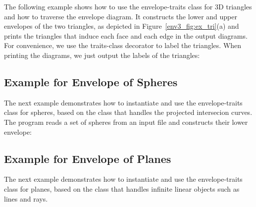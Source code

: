The following example shows how to use the envelope-traits class
for 3D triangles and how to traverse the envelope diagram. It
constructs the lower and upper envelopes of the two triangles,
as depicted in Figure~\ref{env3_fig:ex_tri}(a) and prints the
triangles that induce each face and each edge in the output diagrams.
For convenience, we use the traits-class decorator
 to label the triangles. When
printing the diagrams, we just output the labels of the triangles:


\subsection{Example for Envelope of Spheres}

The next example demonstrates how to instantiate and use the
envelope-traits class for spheres, based on the
 class that handles the projected intersecion
curves. The program reads a set of spheres from an input file and
constructs their lower envelope:


\subsection{Example for Envelope of Planes}

The next example demonstrates how to instantiate and use the
envelope-traits class for planes, based on the
 class that handles infinite linear objects such as lines and rays.

